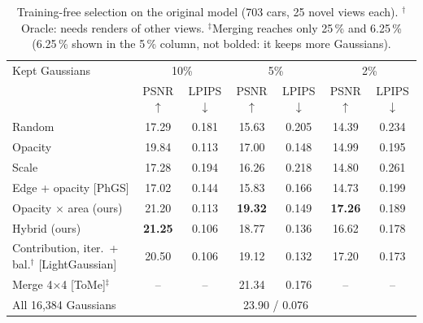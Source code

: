 \begin{table}[t]\centering\small
\setlength{\tabcolsep}{4pt}
\begin{tabular}{lcccccc}
\toprule
Kept Gaussians & \multicolumn{2}{c}{10\%} & \multicolumn{2}{c}{5\%} & \multicolumn{2}{c}{2\%} \\
 & PSNR$\uparrow$ & LPIPS$\downarrow$ & PSNR$\uparrow$ & LPIPS$\downarrow$ & PSNR$\uparrow$ & LPIPS$\downarrow$ \\
\midrule
Random & 17.29 & 0.181 & 15.63 & 0.205 & 14.39 & 0.234 \\
Opacity & 19.84 & 0.113 & 17.00 & 0.148 & 14.99 & 0.195 \\
Scale & 17.28 & 0.194 & 16.26 & 0.218 & 14.80 & 0.261 \\
Edge + opacity [PhGS] & 17.02 & 0.144 & 15.83 & 0.166 & 14.73 & 0.199 \\
Opacity $\times$ area (ours) & 21.20 & 0.113 & \textbf{19.32} & 0.149 & \textbf{17.26} & 0.189 \\
Hybrid (ours) & \textbf{21.25} & 0.106 & 18.77 & 0.136 & 16.62 & 0.178 \\
Contribution, iter.\ + bal.$^\dagger$ [LightGaussian] & 20.50 & 0.106 & 19.12 & 0.132 & 17.20 & 0.173 \\
Merge 4$\times$4 [ToMe]$^\ddagger$ & -- & -- & 21.34 & 0.176 & -- & -- \\
\midrule
All 16,384 Gaussians & \multicolumn{6}{c}{23.90 / 0.076} \\
\bottomrule
\end{tabular}
\caption{Training-free selection on the original model (703 cars, 25 novel views each). $^\dagger$Oracle: needs renders of other views. $^\ddagger$Merging reaches only 25\,\% and 6.25\,\% (6.25\,\% shown in the 5\,\% column, not bolded: it keeps more Gaussians).}
\label{tab:level1}
\end{table}
